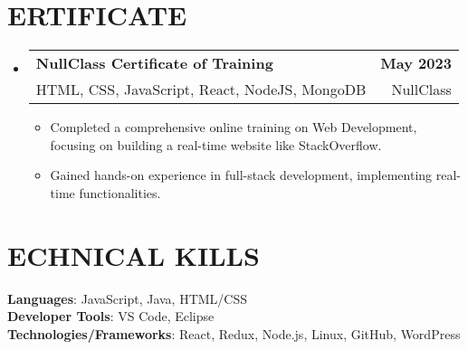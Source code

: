 \documentclass[letterpaper,11pt]{article}
\makeatletter
\newcommand{\resumeItem}[1]{
  \item\small{
    {#1 \vspace{-2pt}}
  }
}
\newcommand{\resumeSubheading}[4]{
  \vspace{-2pt}\item
    \begin{tabular*}{1.0\textwidth}[t]{l@{\extracolsep{\fill}}r}
      \textbf{#1} & \textbf{\small #2} \\
      #3 & #4 \\
    \end{tabular*}\vspace{-7pt}
}
\newcommand{\resumeSubHeadingListStart}{\begin{itemize}[leftmargin=0.0in, label={}]}
\newcommand{\resumeSubHeadingListEnd}{\end{itemize}}
\newcommand{\resumeItemListStart}{\begin{itemize}}
\newcommand{\resumeItemListEnd}{\end{itemize}\vspace{-5pt}}
\makeatother
\begin{document}
\section{\textrm{\scalebox{1.2}{C}ERTIFICATE}}

    \resumeSubHeadingListStart
        \resumeSubheading{NullClass Certificate of Training}{May 2023}{HTML, CSS, JavaScript, React, NodeJS, MongoDB }{NullClass}
            \resumeItemListStart
                \resumeItem{Completed a comprehensive online training on Web Development, focusing on building a real-time website like StackOverflow.  }
                \resumeItem{Gained hands-on experience in full-stack development, implementing real-time functionalities.  }
            \resumeItemListEnd
        \vspace{5pt}
    \resumeSubHeadingListEnd

%
\section{\textrm{\scalebox{1.2}{T}ECHNICAL \scalebox{1.2}{S}KILLS}}

 \begin{itemize}[leftmargin=0.15in, label={}]
    \small{\item{
     \textbf{Languages}{: JavaScript, Java, HTML/CSS} \\
     \textbf{Developer Tools}{: VS Code, Eclipse} \\
     \textbf{Technologies/Frameworks}{: React, Redux, Node.js, Linux, GitHub, WordPress} \\
    }}
 \end{itemize}
 \vspace{-16pt}
\end{document}

